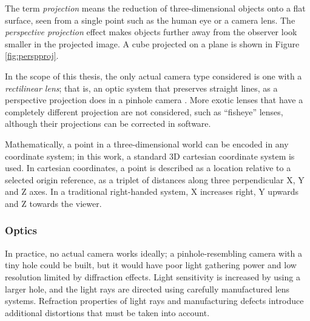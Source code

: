 The term \emph{projection} means the reduction of three-dimensional objects onto a flat surface, seen from a single point such as the human eye or a camera lens.
The \emph{perspective projection} effect makes objects further away from the observer look smaller in the projected image.
A cube projected on a plane is shown in Figure \ref{fig:perspproj}.

In the scope of this thesis, the only actual camera type considered is one with a \emph{rectilinear lens}; that is, an optic system that preserves straight lines, as a perspective projection does in a pinhole camera \cite{greenleaf1950photographic}.
More exotic lenses that have a completely different projection are not considered, such as ``fisheye'' lenses, although their projections can be corrected in software.




Mathematically, a point in a three-dimensional world can be encoded in any coordinate system;
in this work, a standard 3D cartesian coordinate system is used.
In cartesian coordinates, a point is described as a location relative to a selected origin reference, as a triplet of distances along three perpendicular X, Y and Z axes. %
In a traditional right-handed system, X increases right, Y upwards and Z towards the viewer.



\subsubsection{Optics} %

In practice, no actual camera works ideally; a pinhole-resembling camera with a tiny hole could be built, but it would have poor light gathering power and low resolution limited by diffraction effects. \cite{greenleaf1950photographic}
Light sensitivity is increased by using a larger hole, and the light rays are directed using carefully manufactured lens systems.
Refraction properties of light rays and manufacturing defects introduce additional distortions that must be taken into account.

